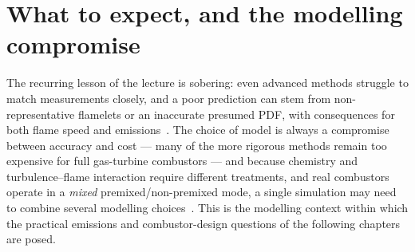 \section{What to expect, and the modelling compromise}

The recurring lesson of the lecture is sobering: even advanced methods struggle to match measurements closely, and a poor prediction can stem from non-representative flamelets or an inaccurate presumed PDF, with consequences for both flame speed and emissions~\cite{lecture10}. The choice of model is always a compromise between accuracy and cost --- many of the more rigorous methods remain too expensive for full gas-turbine combustors --- and because chemistry and turbulence--flame interaction require different treatments, and real combustors operate in a \emph{mixed} premixed/non-premixed mode, a single simulation may need to combine several modelling choices~\cite{lecture10}. This is the modelling context within which the practical emissions and combustor-design questions of the following chapters are posed.

